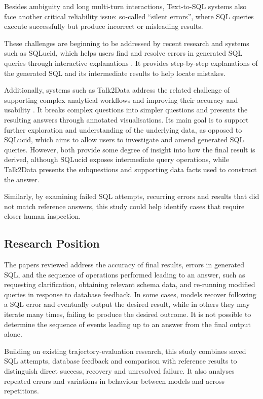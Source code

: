 Besides ambiguity and long multi-turn interactions, 
Text-to-SQL systems also face another critical reliability issue: so-called “silent errors”, 
where SQL queries execute successfully but produce incorrect or misleading results.

These challenges are beginning to be addressed by recent research and systems such as SQLucid, 
which helps users find and resolve errors in generated SQL queries through interactive explanations \citep{tian2024sqlucid}.
It provides step-by-step explanations of the generated SQL and its intermediate results to help locate mistakes.

Additionally, systems such as Talk2Data address the related challenge 
of supporting complex analytical workflows and improving their accuracy and usability \citep{guo2024talk2data}.
It breaks complex questions into simpler questions 
and presents the resulting answers through annotated visualisations.
Its main goal is to support further exploration and understanding of the underlying data, 
as opposed to SQLucid, which aims to allow users to investigate and amend generated SQL queries.
However, both provide some degree of insight into how the final result is derived, 
although SQLucid exposes intermediate query operations, 
while Talk2Data presents the subquestions and supporting data facts used to construct the answer.

Similarly, by examining failed SQL attempts, 
recurring errors and results that did not match reference answers, 
this study could help identify cases that require closer human inspection.

\subsection{Research Position}
\label{sec:literature-position}

The papers reviewed address the accuracy of final results, errors in generated SQL, 
and the sequence of operations performed leading to an answer, 
such as requesting clarification, obtaining relevant schema data, 
and re-running modified queries in response to database feedback. 
In some cases, models recover following a SQL error and
eventually output the desired result, while in others they may iterate many times, 
failing to produce the desired outcome. 
It is not possible to determine the sequence of events leading up to an answer from the final output alone.

Building on existing trajectory-evaluation research, this study combines saved SQL
attempts, database feedback and comparison with reference results to distinguish direct
success, recovery and unresolved failure. 
It also analyses repeated errors and variations in behaviour between models and across repetitions.

